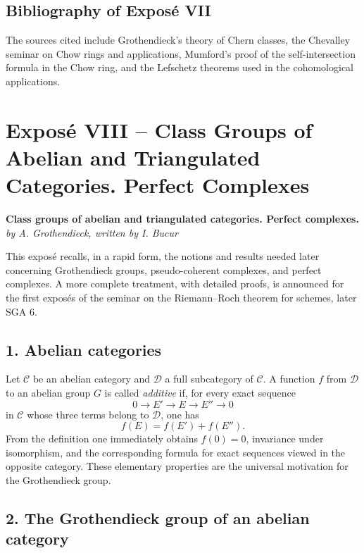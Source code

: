 \documentclass[14pt]{extarticle}
\newcommand{\cC}{\mathcal C}
\newcommand{\cD}{\mathcal D}
\begin{document}
\subsection*{Bibliography of Expos\'e VII}

The sources cited include Grothendieck's theory of Chern classes, the Chevalley seminar on Chow rings and applications, Mumford's proof of the self-intersection formula in the Chow ring, and the Lefschetz theorems used in the cohomological applications.

\newpage

\section*{Expos\'e VIII -- Class Groups of Abelian and Triangulated Categories. Perfect Complexes}

\begin{center}
\textbf{Class groups of abelian and triangulated categories. Perfect complexes.}\\
\emph{by A. Grothendieck, written by I. Bucur}
\end{center}

This expos\'e recalls, in a rapid form, the notions and results needed later concerning Grothendieck groups, pseudo-coherent complexes, and perfect complexes. A more complete treatment, with detailed proofs, is announced for the first expos\'es of the seminar on the Riemann--Roch theorem for schemes, later SGA 6.

\subsection*{1. Abelian categories}

Let $\cC$ be an abelian category and $\cD$ a full subcategory of $\cC$. A function $f$ from $\cD$ to an abelian group $G$ is called \emph{additive} if, for every exact sequence
\[
   0\to E'\to E\to E''\to0
\]
in $\cC$ whose three terms belong to $\cD$, one has
\[
   f(E)=f(E')+f(E'').
\]
From the definition one immediately obtains $f(0)=0$, invariance under isomorphism, and the corresponding formula for exact sequences viewed in the opposite category. These elementary properties are the universal motivation for the Grothendieck group.

\subsection*{2. The Grothendieck group of an abelian category}
\end{document}
